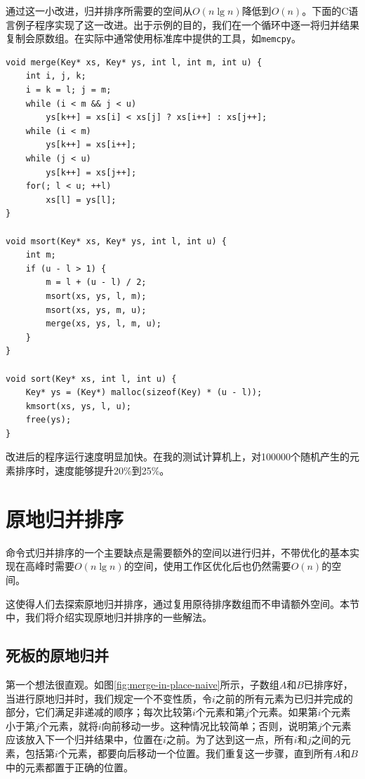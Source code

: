 \documentclass[b5paper]{ctexart}
\begin{document}
通过这一小改进，归并排序所需要的空间从$O(n \lg n)$降低到$O(n)$。下面的C语言例子程序实现了这一改进。出于示例的目的，我们在一个循环中逐一将归并结果复制会原数组。在实际中通常使用标准库中提供的工具，如\texttt{memcpy}。

\lstset{language=C}
\begin{lstlisting}
void merge(Key* xs, Key* ys, int l, int m, int u) {
    int i, j, k;
    i = k = l; j = m;
    while (i < m && j < u)
        ys[k++] = xs[i] < xs[j] ? xs[i++] : xs[j++];
    while (i < m)
        ys[k++] = xs[i++];
    while (j < u)
        ys[k++] = xs[j++];
    for(; l < u; ++l)
        xs[l] = ys[l];
}

void msort(Key* xs, Key* ys, int l, int u) {
    int m;
    if (u - l > 1) {
        m = l + (u - l) / 2;
        msort(xs, ys, l, m);
        msort(xs, ys, m, u);
        merge(xs, ys, l, m, u);
    }
}

void sort(Key* xs, int l, int u) {
    Key* ys = (Key*) malloc(sizeof(Key) * (u - l));
    kmsort(xs, ys, l, u);
    free(ys);
}
\end{lstlisting}

改进后的程序运行速度明显加快。在我的测试计算机上，对100000个随机产生的元素排序时，速度能够提升20\%到25\%。


\section{原地归并排序}

命令式归并排序的一个主要缺点是需要额外的空间以进行归并，不带优化的基本实现在高峰时需要$O(n \lg n)$的空间，使用工作区优化后也仍然需要$O(n)$的空间。

这使得人们去探索原地归并排序，通过复用原待排序数组而不申请额外空间。本节中，我们将介绍实现原地归并排序的一些解法。

\subsection{死板的原地归并}

第一个想法很直观。如图\ref{fig:merge-in-place-naive}所示，子数组$A$和$B$已排序好，当进行原地归并时，我们规定一个不变性质，令$i$之前的所有元素为已归并完成的部分，它们满足非递减的顺序；每次比较第$i$个元素和第$j$个元素。如果第$i$个元素小于第$j$个元素，就将$i$向前移动一步。这种情况比较简单；否则，说明第$j$个元素应该放入下一个归并结果中，位置在$i$之前。为了达到这一点，所有$i$和$j$之间的元素，包括第$i$个元素，都要向后移动一个位置。我们重复这一步骤，直到所有$A$和$B$中的元素都置于正确的位置。
\end{document}
